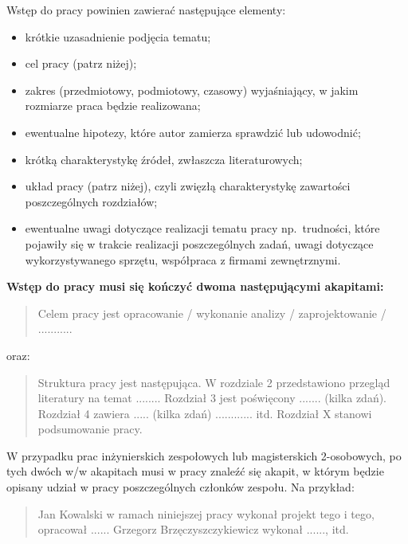Wstęp do pracy powinien zawierać następujące elementy:
\begin{itemize}
    \item krótkie uzasadnienie podjęcia tematu; 
    \item cel pracy (patrz niżej); 
    \item zakres (przedmiotowy, podmiotowy, czasowy) wyjaśniający, w jakim rozmiarze praca będzie realizowana; 
    \item ewentualne hipotezy, które autor zamierza sprawdzić lub udowodnić; 
    \item krótką charakterystykę źródeł, zwłaszcza literaturowych; 
    \item układ pracy (patrz niżej), czyli zwięzłą charakterystykę zawartości poszczególnych rozdziałów; 
    \item ewentualne uwagi dotyczące realizacji tematu pracy np.~trudności, które pojawiły się w trakcie 
    realizacji poszczególnych zadań, uwagi dotyczące wykorzystywanego sprzętu, współpraca z firmami zewnętrznymi. 
\end{itemize}

\noindent
\textbf{Wstęp do pracy musi się kończyć dwoma następującymi akapitami:}
\begin{quote}
Celem pracy jest opracowanie / wykonanie analizy / zaprojektowanie / ...........
\end{quote}
oraz:
\begin{quote}
Struktura pracy jest następująca. W rozdziale 2 przedstawiono przegląd literatury na temat ........ 
Rozdział 3 jest poświęcony ....... (kilka zdań). 
Rozdział 4 zawiera ..... (kilka zdań) ............ itd. 
Rozdział X stanowi podsumowanie pracy. 
\end{quote}

W przypadku prac inżynierskich zespołowych lub magisterskich 2-osobowych, po tych dwóch w/w akapitach 
musi w pracy znaleźć się akapit, w którym będzie opisany udział w pracy poszczególnych członków zespołu. Na przykład:

\begin{quote}
Jan Kowalski w ramach niniejszej pracy wykonał projekt tego i tego, opracował ......
Grzegorz Brzęczyszczykiewicz wykonał ......, itd. 
\end{quote}

